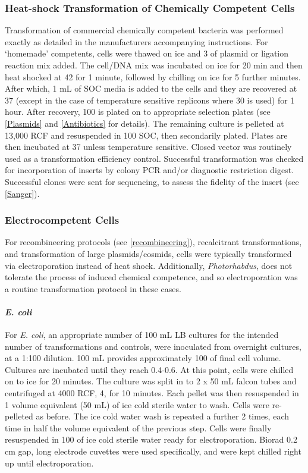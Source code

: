 \subsubsection{Heat-shock Transformation of Chemically Competent Cells}
Transformation of commercial chemically competent bacteria was performed exactly as detailed in the manufacturers accompanying instructions. For `homemade' competents, cells were thawed on ice and 3\ul{} of plasmid or ligation reaction mix added. The cell/DNA mix was incubated on ice for 20 min and then heat shocked at 42\degC{} for 1 minute, followed by chilling on ice for 5 further minutes. After which, 1 mL of SOC media is added to the cells and they are recovered at 37\degC{} (except in the case of temperature sensitive replicons where 30\degC{} is used) for 1 hour. After recovery, 100\ul{} is plated on to appropriate selection plates (see \vref{Plasmids} and \vref{Antibiotics} for details). The remaining culture is pelleted at 13,000 RCF and resuspended in 100\ul{} SOC, then secondarily plated. Plates are then incubated at 37\degC{} unless temperature sensitive. Closed vector was routinely used as a transformation efficiency control.
Successful transformation was checked for incorporation of inserts by colony PCR and/or diagnostic restriction digest. Successful clones were sent for sequencing, to assess the fidelity of the insert (see \vref{Sanger}).

\subsubsection{Electrocompetent Cells}\label{electrocompetents}
For recombineering protocols (see \vref{recombineering}), recalcitrant transformations, and transformation of large plasmids/cosmids, cells were typically transformed via electroporation instead of heat shock. Additionally, \emph{Photorhabdus}, does not tolerate the process of induced chemical competence, and so electroporation was a routine transformation protocol in these cases.

\paragraph{\emph{E. coli}}
For \emph{E. coli}, an appropriate number of 100 mL LB cultures for the intended number of transformations and controls, were inoculated from overnight cultures, at a 1:100 dilution. 100 mL provides approximately 100\ul{} of final cell volume. Cultures are incubated until they reach \OD{} 0.4-0.6. At this point, cells were chilled on to ice for 20 minutes. The culture was split in to 2 x 50 mL falcon tubes and centrifuged at 4000 RCF, 4\degC, for 10 minutes. Each pellet was then resuspended in 1 volume equivalent (50 mL) of ice cold sterile water to wash. Cells were re-pelleted as before. The ice cold water wash is repeated a further 2 times, each time in half the volume equivalent of the previous step. Cells were finally resuspended in 100\ul{} of ice cold sterile water ready for electroporation. Biorad 0.2 cm gap, long electrode cuvettes were used specifically, and were kept chilled right up until electroporation.

